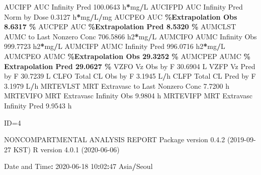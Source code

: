 \documentclass[
  10pt,
]{krantz}
\makeatletter
\newenvironment{Shaded}{\begin{snugshade}}{\end{snugshade}}
\newcommand{\DecValTok}[1]{\textcolor[rgb]{0.00,0.00,0.81}{#1}}
\newcommand{\FloatTok}[1]{\textcolor[rgb]{0.00,0.00,0.81}{#1}}
\newcommand{\NormalTok}[1]{#1}
\newcommand{\OperatorTok}[1]{\textcolor[rgb]{0.81,0.36,0.00}{\textbf{#1}}}
\newcommand{\StringTok}[1]{\textcolor[rgb]{0.31,0.60,0.02}{#1}}
\newenvironment{kframe}{%
\medskip{}
\setlength{\fboxsep}{.8em}
 \def\at@end@of@kframe{}%
 \ifinner\ifhmode%
  \def\at@end@of@kframe{\end{minipage}}%
  \begin{minipage}{\columnwidth}%
 \fi\fi%
 \def\FrameCommand##1{\hskip\@totalleftmargin \hskip-\fboxsep
 \colorbox{shadecolor}{##1}\hskip-\fboxsep
     \hskip-\linewidth \hskip-\@totalleftmargin \hskip\columnwidth}%
 \MakeFramed {\advance\hsize-\width
   \@totalleftmargin\z@ \linewidth\hsize
   \@setminipage}}%
 {\par\unskip\endMakeFramed%
 \at@end@of@kframe}
\renewenvironment{Shaded}{\begin{kframe}}{\end{kframe}}
\makeatother
\begin{document}
\begin{Shaded}
\begin{Highlighting}[]
\NormalTok{AUCIFP     AUC Infinity Pred                             }\FloatTok{100.0643}\NormalTok{ h}\OperatorTok{*}\NormalTok{mg}\OperatorTok{/}\NormalTok{L}
\NormalTok{AUCIFPD    AUC Infinity Pred Norm by Dose                  }\FloatTok{0.3127}\NormalTok{ h}\OperatorTok{*}\NormalTok{mg}\OperatorTok{/}\NormalTok{L}\OperatorTok{/}\NormalTok{mg}
\NormalTok{AUCPEO     AUC }\OperatorTok{\%Extrapolation Obs                          8.6317 \%}
\NormalTok{AUCPEP     AUC }\OperatorTok{\%Extrapolation Pred                         8.5320 \%}
\NormalTok{AUMCLST    AUMC to Last Nonzero Conc                     }\FloatTok{706.5866}\NormalTok{ h2}\OperatorTok{*}\NormalTok{mg}\OperatorTok{/}\NormalTok{L}
\NormalTok{AUMCIFO    AUMC Infinity Obs                             }\FloatTok{999.7723}\NormalTok{ h2}\OperatorTok{*}\NormalTok{mg}\OperatorTok{/}\NormalTok{L}
\NormalTok{AUMCIFP    AUMC Infinity Pred                            }\FloatTok{996.0716}\NormalTok{ h2}\OperatorTok{*}\NormalTok{mg}\OperatorTok{/}\NormalTok{L}
\NormalTok{AUMCPEO    AUMC }\OperatorTok{\%Extrapolation Obs                        29.3252 \%}
\NormalTok{AUMCPEP    AUMC }\OperatorTok{\% Extrapolation Pred                      29.0627 \%}
\NormalTok{VZFO       Vz Obs by F                                    }\FloatTok{30.6904}\NormalTok{ L}
\NormalTok{VZFP       Vz Pred by F                                   }\FloatTok{30.7239}\NormalTok{ L}
\NormalTok{CLFO       Total CL Obs by F                               }\FloatTok{3.1945}\NormalTok{ L}\OperatorTok{/}\NormalTok{h}
\NormalTok{CLFP       Total CL Pred by F                              }\FloatTok{3.1979}\NormalTok{ L}\OperatorTok{/}\NormalTok{h}
\NormalTok{MRTEVLST   MRT Extravasc to Last Nonzero Conc              }\FloatTok{7.7200}\NormalTok{ h}
\NormalTok{MRTEVIFO   MRT Extravasc Infinity Obs                      }\FloatTok{9.9804}\NormalTok{ h}
\NormalTok{MRTEVIFP   MRT Extravasc Infinity Pred                     }\FloatTok{9.9543}\NormalTok{ h}





\NormalTok{ID=}\DecValTok{4}

\NormalTok{                        NONCOMPARTMENTAL ANALYSIS REPORT}
\NormalTok{                       Package version }\DecValTok{0}\NormalTok{.}\FloatTok{4.2}\NormalTok{ (}\DecValTok{2019{-}09{-}27}\NormalTok{ KST)}
\NormalTok{                          R version }\DecValTok{4}\NormalTok{.}\FloatTok{0.1}\NormalTok{ (}\DecValTok{2020{-}06{-}06}\NormalTok{)}

\NormalTok{Date and Time}\OperatorTok{:}\StringTok{ }\DecValTok{2020{-}06{-}18} \DecValTok{10}\OperatorTok{:}\DecValTok{02}\OperatorTok{:}\DecValTok{47}\NormalTok{ Asia}\OperatorTok{/}\NormalTok{Seoul}


\end{Highlighting}
\end{Shaded}
\end{document}
